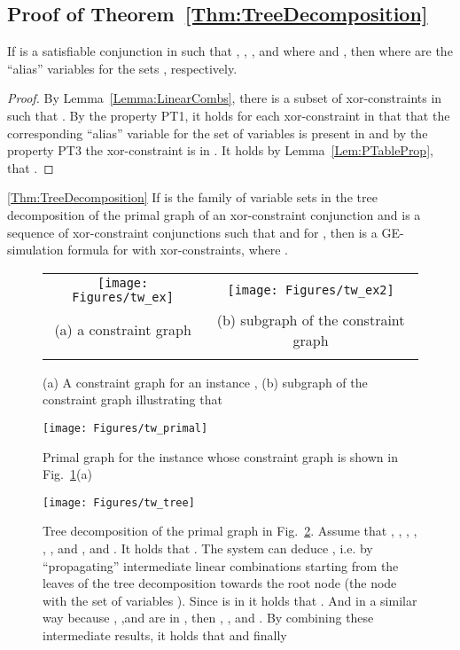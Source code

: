 \subsection{Proof of Theorem~\ref{Thm:TreeDecomposition}}

\begin{lemma}
\label{Lem:PCProp}
If  is a satisfiable conjunction in  such that
, , ,
and 
where 
and , 
then 
where  are the ``alias'' variables for the sets , respectively.
\end{lemma}

\begin{proof}
By Lemma~\ref{Lemma:LinearCombs}, there is a subset  of xor-constraints in  such that .
By the property PT1, it holds for each xor-constraint  in  
that that the corresponding ``alias'' variable  for the set of
variables  is present in 
and by the property PT3 the xor-constraint  is in .
It holds by Lemma~\ref{Lem:PTableProp}, that .
\end{proof}


\begin{retheorem}{\ref{Thm:TreeDecomposition}}
If  is the family of variable sets in the tree
decomposition of the primal graph of an xor-constraint conjunction  and 
 is a sequence of xor-constraint conjunctions
such that  and  for , then  is a GE-simulation formula for
 with  xor-constraints, where
.  
\end{retheorem}

\begin{figure}[ht]
\centering
\begin{tabular}{c@{\qquad}c}
\texttt{[image: Figures/tw\_ex]}
&
\texttt{[image: Figures/tw\_ex2]}
\\
(a) a constraint graph
&
(b) subgraph of the constraint graph
\\
\\
\end{tabular}
\caption{(a) A constraint graph for an instance , (b) subgraph of the constraint graph illustrating that }
\label{Fig:TWEx}
\end{figure}

\begin{figure}[ht]
\centering
\texttt{[image: Figures/tw\_primal]}
\caption{Primal graph for the instance whose constraint graph is shown in Fig.~\ref{Fig:TWEx}(a)}
\label{Fig:TWExp}
\end{figure}

\begin{figure}[ht]
\centering
\texttt{[image: Figures/tw\_tree]}
\caption{Tree decomposition of the primal graph in Fig.~\ref{Fig:TWExp}. Assume
that , , , , , , and
, and . It holds that
        . The \UP{} system can deduce , i.e.  by ``propagating'' intermediate linear combinations
        starting from the leaves of the tree decomposition towards the root
        node (the node with the set of variables ). Since  is in
         it holds that . And in a similar way because , ,and  are in , then
        ,
    , and . By combining these
        intermediate results, it holds that  and finally }
        \label{Fig:TWTree}
\end{figure}






